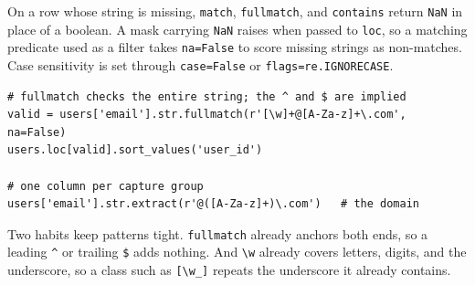 \vspace{1ex}

\begin{keybox}
On a row whose string is missing, \texttt{match}, \texttt{fullmatch}, and \texttt{contains} return \texttt{NaN} in place of a boolean. A mask carrying \texttt{NaN} raises when passed to \texttt{loc}, so a matching predicate used as a filter takes \texttt{na=False} to score missing strings as non-matches. Case sensitivity is set through \texttt{case=False} or \texttt{flags=re.IGNORECASE}.
\end{keybox}

\newpage

\begin{lstlisting}[style=python, caption={Validate whole strings, then extract a field}]
# fullmatch checks the entire string; the ^ and $ are implied
valid = users['email'].str.fullmatch(r'[\w]+@[A-Za-z]+\.com', na=False)
users.loc[valid].sort_values('user_id')

# one column per capture group
users['email'].str.extract(r'@([A-Za-z]+)\.com')   # the domain
\end{lstlisting}

\vspace{-1ex}

Two habits keep patterns tight. \texttt{fullmatch} already anchors both ends, so a leading \texttt{\textasciicircum} or trailing \texttt{\$} adds nothing. And \texttt{\textbackslash w} already covers letters, digits, and the underscore, so a class such as \texttt{[\textbackslash w\_]} repeats the underscore it already contains.

